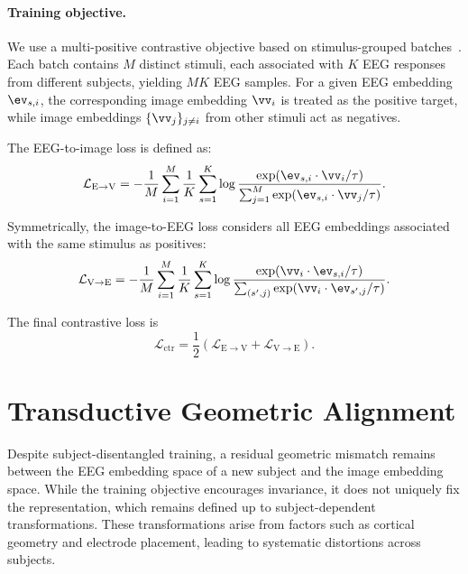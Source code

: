 \paragraph{Training objective.}
We use a multi-positive contrastive objective based on stimulus-grouped batches~\cite{khosla2020supcon}. Each batch contains $M$ distinct stimuli, each associated with $K$ EEG responses from different subjects, yielding $MK$ EEG samples. 
{\color{red}For a given EEG embedding $\ev_{s,i}$, the corresponding image embedding $\vv_{i}$ is treated as the positive target, while image embeddings $\{\vv_{j}\}_{j \neq i}$ from other stimuli act as negatives.}

The EEG-to-image loss is defined as:
\begin{equation}
\mathcal{L}_{\mathrm{E \to V}} =
-\frac{1}{M} \sum_{i=1}^{M} \frac{1}{K}\sum_{s=1}^{K}
\log 
\frac{\exp(\ev_{s,i} \cdot \vv_{i} / \tau)}
{\sum_{j=1}^{M} \exp(\ev_{s,i} \cdot \vv_{j} / \tau)}.
\end{equation}

Symmetrically, the image-to-EEG loss considers all EEG embeddings associated with the same stimulus as positives:
\begin{equation}
\mathcal{L}_{\mathrm{V \to E}} =
-\frac{1}{M} \sum_{i=1}^{M}
\frac{1}{K} \sum_{s=1}^{K}
\log 
\frac{\exp(\vv_{i} \cdot \ev_{s,i} / \tau)}
{\sum_{(s',j)} \exp(\vv_{i} \cdot \ev_{s',j} / \tau)}.
\end{equation}

The final contrastive loss is
\begin{equation}
\mathcal{L}_{\mathrm{ctr}} = \frac{1}{2} \left( \mathcal{L}_{\mathrm{E \to V}} + \mathcal{L}_{\mathrm{V \to E}} \right).
\end{equation}





\section{Transductive Geometric Alignment}
\label{sec:testing}
Despite subject-disentangled training, a residual geometric mismatch remains between the EEG embedding space of a new subject and the image embedding space. 
While the training objective encourages invariance, it does not uniquely fix the representation, which remains defined up to subject-dependent transformations. 
These transformations arise from factors such as cortical geometry and electrode placement, leading to systematic distortions across subjects.

